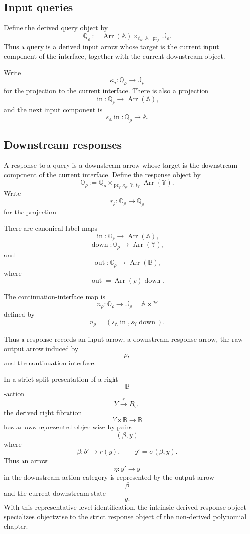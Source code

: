 \subsection{Input queries}

Define the derived query object by
\[
\mathbb Q_\rho
:=
\operatorname{Arr}(\mathbb A)
\times_{t_{\mathbb A},\,\mathbb A,\,\operatorname{pr}_{\mathbb A}}
\mathbb J_\rho.
\]
Thus a query is a derived input arrow whose target is the current input
component of the interface, together with the current downstream object.

Write
\[
\kappa_\rho:\mathbb Q_\rho\to\mathbb J_\rho
\]
for the projection to the current interface.  There is also a projection
\[
\operatorname{in}:\mathbb Q_\rho\to\operatorname{Arr}(\mathbb A),
\]
and the next input component is
\[
s_{\mathbb A}\operatorname{in}:\mathbb Q_\rho\to\mathbb A.
\]

\subsection{Downstream responses}

A response to a query is a downstream arrow whose target is the downstream
component of the current interface.  Define the response object by
\[
\mathbb O_\rho
:=
\mathbb Q_\rho
\times_{\operatorname{pr}_{\mathbb Y}\kappa_\rho,\,\mathbb Y,\,t_{\mathbb Y}}
\operatorname{Arr}(\mathbb Y).
\]
Write
\[
r_\rho:\mathbb O_\rho\to\mathbb Q_\rho
\]
for the projection.

There are canonical label maps
\[
\operatorname{in}:\mathbb O_\rho\to\operatorname{Arr}(\mathbb A),
\]
\[
\operatorname{down}:\mathbb O_\rho\to\operatorname{Arr}(\mathbb Y),
\]
and
\[
\operatorname{out}:\mathbb O_\rho\to\operatorname{Arr}(\mathbb B),
\]
where
\[
\operatorname{out}
=
\operatorname{Arr}(\rho)\operatorname{down}.
\]

The continuation-interface map is
\[
n_\rho:\mathbb O_\rho\to\mathbb J_\rho=\mathbb A\times\mathbb Y
\]
defined by
\[
n_\rho
=
\left(
s_{\mathbb A}\operatorname{in},
s_{\mathbb Y}\operatorname{down}
\right).
\]

Thus a response records an input arrow, a downstream response arrow, the raw
output arrow induced by
\[
\rho,
\]
and the continuation interface.

\begin{remark}
\label{rem:derived-poly-response-strict-reading}
In a strict split presentation of a right
\[
\mathbb B
\]
-action
\[
Y\xrightarrow{r}B_0,
\]
the derived right fibration
\[
Y\rtimes\mathbb B\to\mathbb B
\]
has arrows represented objectwise by pairs
\[
(\beta,y)
\]
where
\[
\beta:b'\to r(y),
\qquad
y'=\sigma(\beta,y).
\]
Thus an arrow
\[
\eta:y'\to y
\]
in the downstream action category is represented by the output arrow
\[
\beta
\]
and the current downstream state
\[
y.
\]
With this representative-level identification, the intrinsic derived response
object specializes objectwise to the strict response object of the
non-derived polynomial chapter.
\end{remark}

